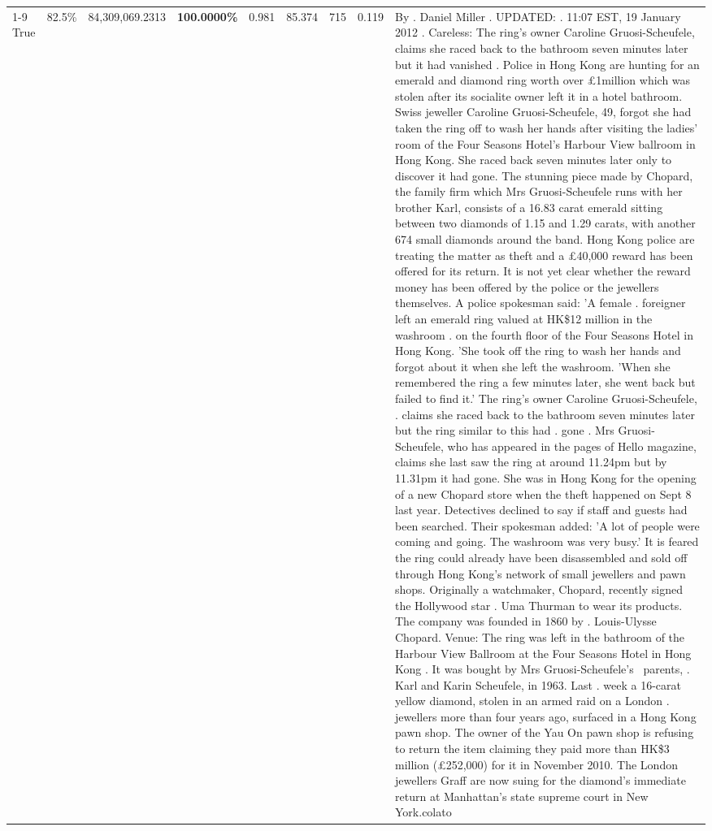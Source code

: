 \begin{table}[H]
\begin{tabular}{lllrlllll}
\cline{1-9} \cline{2-9}
True & 82.5\% & 84,309,069.2313 & \bfseries \color{red} 100.0000\% & 0.981 & 85.374 & 715 & 0.119 & By . Daniel Miller . UPDATED: . 11:07 EST, 19 January 2012 . Careless: The ring's owner Caroline Gruosi-Scheufele, claims she raced back to the bathroom seven minutes later but it had vanished . Police in Hong Kong are hunting for an emerald and diamond ring worth over £1million which was stolen after its socialite owner left it in a hotel bathroom. Swiss jeweller Caroline Gruosi-Scheufele, 49, forgot she had taken the ring off to wash her hands after visiting the ladies' room of the Four Seasons Hotel's Harbour View ballroom in Hong Kong. She raced back seven minutes later only to discover it had gone. The stunning piece made by Chopard, the family firm which Mrs Gruosi-Scheufele runs with her brother Karl, consists of a 16.83 carat emerald sitting between two diamonds of 1.15 and 1.29 carats, with another 674 small diamonds around the band. Hong Kong police are treating the matter as theft and a £40,000 reward has been offered for its return. It is not yet clear whether the reward money has been offered by the police or the jewellers themselves. A police spokesman said: 'A female . foreigner left an emerald ring valued at HK\$12 million in the washroom . on the fourth floor of the Four Seasons Hotel in Hong Kong. 'She took off the ring to wash her hands and forgot about it when she left the washroom. 'When she remembered the ring a few minutes later, she went back but failed to find it.' The ring's owner Caroline Gruosi-Scheufele, . claims she raced back to the bathroom seven minutes later but the ring similar to this had . gone . Mrs Gruosi-Scheufele, who has appeared in the pages of Hello magazine, claims she last saw the ring at around 11.24pm but by 11.31pm it had gone. She was in Hong Kong for the opening of a new Chopard store when the theft happened on Sept 8 last year. Detectives declined to say if staff and guests had been searched. Their spokesman added: 'A lot of people were coming and going. The washroom was very busy.' It is feared the ring could already have been disassembled and sold off through Hong Kong's network of small jewellers and pawn shops. Originally a watchmaker, Chopard, recently signed the Hollywood star . Uma Thurman to wear its products. The company was founded in 1860 by . Louis-Ulysse Chopard. Venue: The ring was left in the bathroom of the Harbour View Ballroom at the Four Seasons Hotel in Hong Kong . It was bought by Mrs Gruosi-Scheufele's  parents, . Karl and Karin Scheufele, in 1963. Last . week a 16-carat yellow diamond, stolen in an armed raid on a London . jewellers more than four years ago, surfaced in a Hong Kong pawn shop. The owner of the Yau On pawn shop is refusing to return the item claiming they paid more than HK\$3 million (£252,000) for it in November 2010. The London jewellers Graff are now suing for the diamond’s immediate return at Manhattan’s state supreme court in New York.colato \\

\end{tabular}
\end{table}
